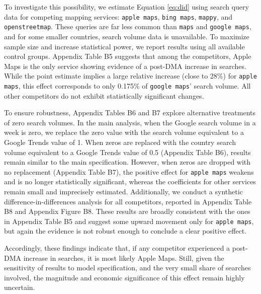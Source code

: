 \documentclass[11pt]{article}
\begin{document}
	To investigate this possibility, we estimate Equation \ref{eq:did} using search query data for competing mapping services: \texttt{apple maps}, \texttt{bing maps}, \texttt{mappy}, and \texttt{openstreetmap}. These queries are far less common than \texttt{maps} and \texttt{google maps}, and for some smaller countries, search volume data is unavailable. To maximize sample size and increase statistical power, we report results using all available control groups. Appendix Table B5 suggests that among the competitors, Apple Maps is the only service showing evidence of a post-DMA increase in searches. While the point estimate implies a large relative increase (close to 28\%) for \texttt{apple maps}, this effect corresponds to only 0.175\% of \texttt{google maps}’ search volume. All other competitors do not exhibit statistically significant changes.
	
	To ensure robustness, Appendix Tables B6 and B7 explore alternative treatments of zero search volumes. In the main analysis, when the Google search volume in a week is zero, we replace the zero value with the search volume equivalent to a Google Trends value of 1. When zeros are replaced with the country search volume equivalent to a Google Trends value of 0.5 (Appendix Table B6), results remain similar to the main specification. However, when zeros are dropped with no replacement (Appendix Table B7), the positive effect for \texttt{apple maps} weakens and is no longer statistically significant, whereas the coefficients for other services remain small and imprecisely estimated. Additionally, we conduct a synthetic difference-in-differences analysis for all competitors, reported in Appendix Table B8 and Appendix Figure B8. These results are broadly consistent with the ones in Appendix Table B5 and suggest some upward movement only for \texttt{apple maps}, but again the evidence is not robust enough to conclude a clear positive effect.
	
	Accordingly, these findings indicate that, if any competitor experienced a post-DMA increase in searches, it is most likely Apple Maps. Still, given the sensitivity of results to model specification, and the very small share of searches involved, the magnitude and economic significance of this effect remain highly uncertain.
	
\end{document}
